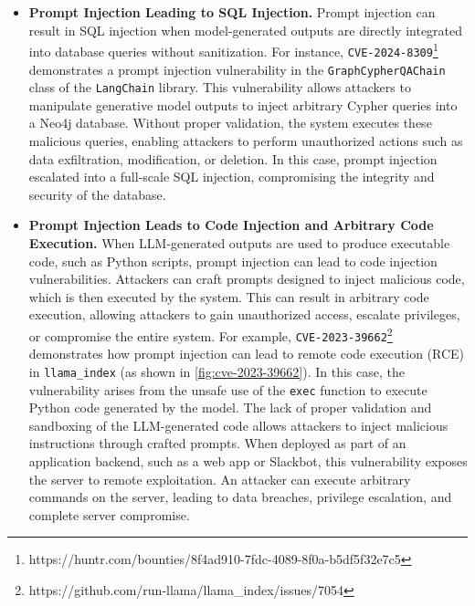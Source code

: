\begin{itemize}[leftmargin=10pt]
    \item \textbf{Prompt Injection Leading to SQL Injection.}  
    Prompt injection can result in SQL injection when model-generated outputs are directly integrated into database queries without sanitization. For instance, \texttt{CVE-2024-8309}\footnote{https://huntr.com/bounties/8f4ad910-7fdc-4089-8f0a-b5df5f32e7c5} demonstrates a prompt injection vulnerability in the \texttt{GraphCypherQAChain} class of the \texttt{LangChain} library. This vulnerability allows attackers to manipulate generative model outputs to inject arbitrary Cypher queries into a Neo4j database. Without proper validation, the system executes these malicious queries, enabling attackers to perform unauthorized actions such as data exfiltration, modification, or deletion. In this case, prompt injection escalated into a full-scale SQL injection, compromising the integrity and security of the database.

    \item \textbf{Prompt Injection Leads to Code Injection and Arbitrary Code Execution.}  
    When LLM-generated outputs are used to produce executable code, such as Python scripts, prompt injection can lead to code injection vulnerabilities. Attackers can craft prompts designed to inject malicious code, which is then executed by the system. This can result in arbitrary code execution, allowing attackers to gain unauthorized access, escalate privileges, or compromise the entire system. For example, \texttt{CVE-2023-39662}\footnote{https://github.com/run-llama/llama\_index/issues/7054} demonstrates how prompt injection can lead to remote code execution (RCE) in \texttt{llama\_index} (as shown in \autoref{fig:cve-2023-39662}). In this case, the vulnerability arises from the unsafe use of the \texttt{exec} function to execute Python code generated by the model. The lack of proper validation and sandboxing of the LLM-generated code allows attackers to inject malicious instructions through crafted prompts. When deployed as part of an application backend, such as a web app or Slackbot, this vulnerability exposes the server to remote exploitation. An attacker can execute arbitrary commands on the server, leading to data breaches, privilege escalation, and complete server compromise. 
    

\end{itemize}
